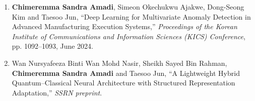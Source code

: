 \begin{titlepage}
\begin{enumerate}
\item \textbf{Chimeremma Sandra Amadi}, Simeon Okechukwu Ajakwe, Dong-Seong Kim and Taesoo Jun, ``Deep Learning for Multivariate Anomaly Detection in Advanced Manufacturing Execution Systems,'' \textit{Proceedings of the Korean Institute of Communications and Information Sciences (KICS) Conference}, pp. 1092--1093, June 2024.

\item Wan Nursyafeeza Binti Wan Mohd Nasir, Sheikh Sayed Bin Rahman, \textbf{Chimeremma Sandra Amadi} and Taesoo Jun, ``A Lightweight Hybrid Quantum--Classical Neural Architecture with Structured Representation Adaptation,'' \textit{SSRN preprint}.
\end{enumerate}

\end{titlepage}
